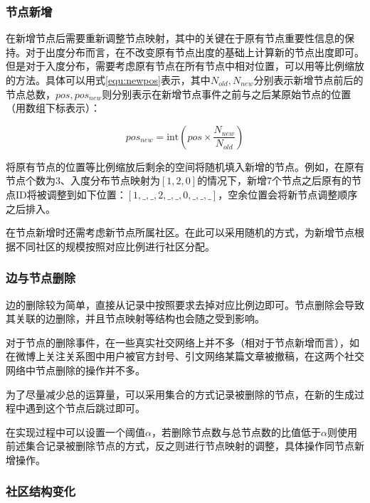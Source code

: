 \vspace{0.2cm}

\subsubsection{节点新增}

在新增节点后需要重新调整节点映射，其中的关键在于原有节点重要性信息的保持。对于出度分布而言，在不改变原有节点出度的基础上计算新的节点出度即可。但是对于入度分布，需要考虑原有节点在所有节点中相对位置，可以用等比例缩放的方法。具体可以用式\ref{equ:newpos}表示，其中$N_{old}, N_{new}$分别表示新增节点前后的节点总数，$pos, pos_{new}$则分别表示在新增节点事件之前与之后某原始节点的位置（用数组下标表示）：

\vspace{-8mm}

\begin{equation}
  \label{equ:newpos}
  pos_{new} = \text{int}\left(pos\times \frac{N_{new}}{N_{old}}\right)
\end{equation}

将原有节点的位置等比例缩放后剩余的空间将随机填入新增的节点。例如，在原有节点个数为3、入度分布节点映射为$[1,2,0]$的情况下，新增7个节点之后原有的节点ID将被调整到如下位置：$[1,\_,\_,2,\_,\_,0,\_,\_,\_]$，空余位置会将新节点调整顺序之后排入。

在节点新增时还需考虑新节点所属社区。在此可以采用随机的方式，为新增节点根据不同社区的规模按照对应比例进行社区分配。

\subsubsection{边与节点删除}

边的删除较为简单，直接从记录中按照要求去掉对应比例边即可。节点删除会导致其关联的边删除，并且节点映射等结构也会随之受到影响。

对于节点的删除事件，在一些真实社交网络上并不多（相对于节点新增而言），如在微博上关注关系图中用户被官方封号、引文网络某篇文章被撤稿，在这两个社交网络中节点删除的操作并不多。

为了尽量减少总的运算量，可以采用集合的方式记录被删除的节点，在新的生成过程中遇到这个节点后跳过即可。

在实现过程中可以设置一个阈值$\alpha$，若删除节点数与总节点数的比值低于$\alpha$则使用前述集合记录被删除节点的方式，反之则进行节点映射的调整，具体操作同节点新增操作。

\subsubsection{社区结构变化}

